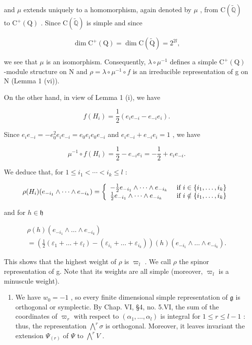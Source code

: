 and \(\mu\) extends uniquely to a homomorphism, again denoted by \(\mu\) , from \(\mathrm{C}(\tilde{\mathbb{Q}})\) to \(\mathrm{C}^{+}(\mathrm{Q})\) . Since \(\mathrm{C}(\tilde{\mathbb{Q}})\) is simple and since

\[
\dim \mathrm{C} ^ {+} (\mathrm{Q}) = \dim \mathrm{C} (\tilde {\mathrm{Q}}) = 2 ^ {2 l},
\]

we see that \(\mu\) is an isomorphism. Consequently, \(\lambda \circ \mu^{-1}\) defines a simple \(\mathrm{C}^{+}(\mathrm{Q})\) -module structure on N and \(\rho = \lambda \circ \mu^{-1} \circ f\) is an irreducible representation of g on N (Lemma 1 (vi)).

On the other hand, in view of Lemma 1 (i), we have

\[
f (H _ {i}) = \frac {1}{2} (e _ {i} e _ {- i} - e _ {- i} e _ {i}).
\]

Since \(e_{i}e_{-i} = -e_{0}^{2}e_{i}e_{-i} = e_{0}e_{i}e_{0}e_{-i}\) and \(e_{i}e_{-i} + e_{-i}e_{i} = 1\) , we have

\[
\mu^ {- 1} \circ f (H _ {i}) = \frac {1}{2} - e _ {- i} e _ {i} = - \frac {1}{2} + e _ {i} e _ {- i}.
\]

We deduce that, for \(1 \leq i_{1} < \cdots < i_{k} \leq l\) :

\[
\rho (H _ {i}) (e _ {- i _ {1}} \wedge \dots \wedge e _ {- i _ {k}}) = \left\{ \begin{array}{l l} - \frac {1}{2} e _ {- i _ {1}} \wedge \dots \wedge e _ {- i _ {k}} & \text { if } i \in \{i _ {1}, \ldots , i _ {k} \} \\ \frac {1}{2} e _ {- i _ {1}} \wedge \dots \wedge e _ {- i _ {k}} & \text { if } i \notin \{i _ {1}, \ldots , i _ {k} \} \end{array} \right.
\]

and for \(h\in \mathfrak{h}\)

\[
\begin{array}{l} \rho (h) (e _ {- i _ {1}} \wedge \dots \wedge e _ {- i _ {k}}) \\ = (\frac {1}{2} (\varepsilon_ {1} + \dots + \varepsilon_ {l}) - (\varepsilon_ {i _ {1}} + \dots + \varepsilon_ {i _ {k}})) (h) (e _ {- i _ {1}} \wedge \dots \wedge e _ {- i _ {k}}). \end{array} \tag {5}
\]

This shows that the highest weight of \(\rho\) is \(\varpi_{l}\) . We call \(\rho\) the spinor representation of g. Note that its weights are all simple (moreover, \(\varpi_{l}\) is a minuscule weight).

\begin{enumerate}
\def\labelenumi{(\Alph{enumi})}
\setcounter{enumi}{21}
\tightlist
\item
  We have \(w_0 = -1\) , so every finite dimensional simple representation of \(\mathfrak{g}\) is orthogonal or symplectic. By Chap. VI, §4, no. 5.VI, the sum of the coordinates of \(\varpi_r\) with respect to \((\alpha_1, \ldots, \alpha_l)\) is integral for \(1 \leq r \leq l - 1\) : thus, the representation \(\bigwedge^r \sigma\) is orthogonal. Moreover, it leaves invariant the extension \(\Psi_{(r)}\) of \(\Psi\) to \(\bigwedge^r V\) .
\end{enumerate}

